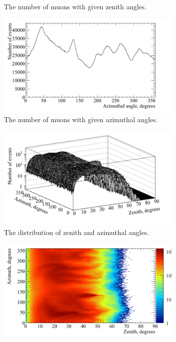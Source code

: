\begin{figure}
\begin{subfigure}{0.45\textwidth}
    \caption{The number of muons with given zenith angles.}
  \end{subfigure}
  \hspace{0.08\textwidth}
  \begin{subfigure}{0.45\textwidth}
    \centering
    \includegraphics[width=\textwidth]{AzimuthCan}
    \caption{The number of muons with given azimuthal angles.}
  \end{subfigure}
  \begin{subfigure}{0.45\textwidth}
    \centering
    \includegraphics[width=\textwidth]{AziZenCan}
    \caption{The distribution of zenith and azimuthal angles.}
  \end{subfigure}
  \hspace{0.08\textwidth}
  \begin{subfigure}{0.45\textwidth}
    \centering
    \includegraphics[width=\textwidth]{AziZenColzCan}

\end{subfigure}
\end{figure}
